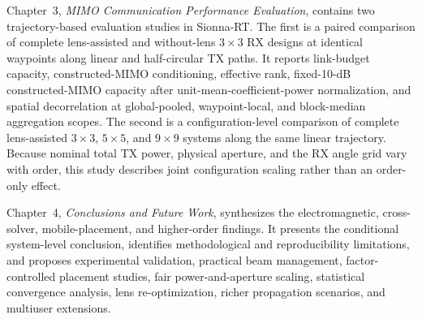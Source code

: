 Chapter~3, \textit{MIMO Communication Performance Evaluation}, contains two trajectory-based evaluation studies in Sionna-RT\@. The first is a paired comparison of complete lens-assisted and without-lens $3\times3$ RX designs at identical waypoints along linear and half-circular TX paths. It reports link-budget capacity, constructed-MIMO conditioning, effective rank, fixed-10-dB constructed-MIMO capacity after unit-mean-coefficient-power normalization, and spatial decorrelation at global-pooled, waypoint-local, and block-median aggregation scopes. The second is a configuration-level comparison of complete lens-assisted $3\times3$, $5\times5$, and $9\times9$ systems along the same linear trajectory. Because nominal total TX power, physical aperture, and the RX angle grid vary with order, this study describes joint configuration scaling rather than an order-only effect.

Chapter~4, \textit{Conclusions and Future Work}, synthesizes the electromagnetic, cross-solver, mobile-placement, and higher-order findings. It presents the conditional system-level conclusion, identifies methodological and reproducibility limitations, and proposes experimental validation, practical beam management, factor-controlled placement studies, fair power-and-aperture scaling, statistical convergence analysis, lens re-optimization, richer propagation scenarios, and multiuser extensions.












